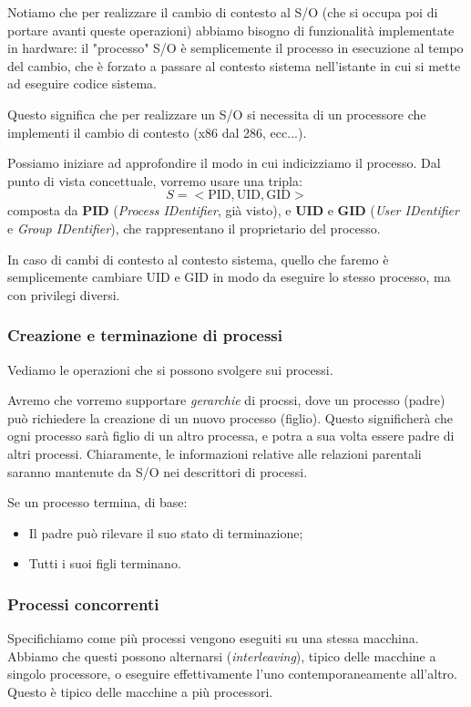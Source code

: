 \documentclass[a4paper,11pt]{article}
\begin{document}
Notiamo che per realizzare il cambio di contesto al S/O (che si occupa poi di portare avanti queste operazioni) abbiamo bisogno di funzionalità implementate in hardware: il "processo" S/O è semplicemente il processo in esecuzione al tempo del cambio, che è forzato a passare al contesto sistema nell'istante in cui si mette ad eseguire codice sistema.

Questo significa che per realizzare un S/O si necessita di un processore che implementi il cambio di contesto (x86 dal 286, ecc...). 

\par\smallskip

Possiamo iniziare ad approfondire il modo in cui indicizziamo il processo. Dal punto di vista concettuale, vorremo usare una tripla:
$$
S = < \text{PID}, \text{UID}, \text{GID} >
$$
composta da \textbf{PID} (\textit{Process IDentifier}, già visto), e \textbf{UID} e \textbf{GID} (\textit{User IDentifier} e \textit{Group IDentifier}), che rappresentano il proprietario del processo.

In caso di cambi di contesto al contesto sistema, quello che faremo è semplicemente cambiare UID e GID in modo da eseguire lo stesso processo, ma con privilegi diversi.

\subsubsection{Creazione e terminazione di processi}
Vediamo le operazioni che si possono svolgere sui processi.

Avremo che vorremo supportare \textit{gerarchie} di procssi, dove un processo (padre) può richiedere la creazione di un nuovo processo (figlio).
Questo significherà che ogni processo sarà figlio di un altro processa, e potra a sua volta essere padre di altri processi.
Chiaramente, le informazioni relative alle relazioni parentali saranno mantenute da S/O nei descrittori di processi.

Se un processo termina, di base:
\begin{itemize}
	\item Il padre può rilevare il suo stato di terminazione;
	\item Tutti i suoi figli terminano.
\end{itemize}

\subsubsection{Processi concorrenti}
Specifichiamo come più processi vengono eseguiti su una stessa macchina.
Abbiamo che questi possono alternarsi (\textit{interleaving}), tipico delle macchine a singolo processore, o eseguire effettivamente l'uno contemporaneamente all'altro. Questo è tipico delle macchine a più processori.
\end{document}
